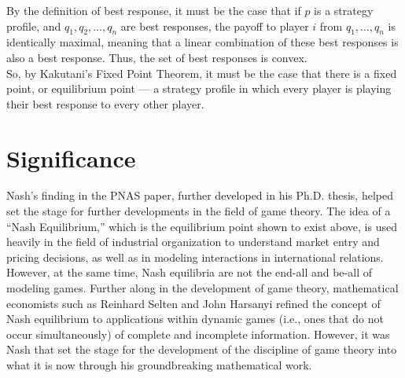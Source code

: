 \documentclass[12pt]{extarticle}
\begin{document}
  By the definition of best response, it must be the case that if $p$ is a strategy profile, and $q_1,q_2,\dots,q_n$ are best responses, the payoff to player $i$ from $q_1,\dots,q_n$ is identically maximal, meaning that a linear combination of these best responses is also a best response. Thus, the set of best responses is convex.\\

  So, by Kakutani's Fixed Point Theorem, it must be the case that there is a fixed point, or equilibrium point --- a strategy profile in which every player is playing their best response to every other player.
  \section*{Significance}%
  Nash's finding in the PNAS paper, further developed in his Ph.D. thesis, helped set the stage for further developments in the field of game theory. The idea of a ``Nash Equilibrium,'' which is the equilibrium point shown to exist above, is used heavily in the field of industrial organization to understand market entry and pricing decisions, as well as in modeling interactions in international relations.\\

  However, at the same time, Nash equilibria are not the end-all and be-all of modeling games. Further along in the development of game theory, mathematical economists such as Reinhard Selten and John Harsanyi refined the concept of Nash equilibrium to applications within dynamic games (i.e., ones that do not occur simultaneously) of complete and incomplete information. However, it was Nash that set the stage for the development of the discipline of game theory into what it is now through his groundbreaking mathematical work.
\end{document}

